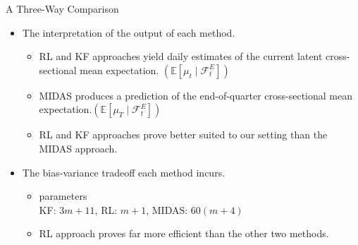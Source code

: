 \documentclass[UTF8, 16pt]{beamer}
\begin{document}
\begin{CJK*}{UTF8}{gbsn}
\begin{frame}{A Three-Way Comparison}
	\begin{itemize}
		\item The interpretation of the output of each method.
			\begin{itemize}
				\item RL and KF approaches yield daily estimates of the current latent cross-sectional mean expectation. $(\mathbb{E}\left[\mu_{t} \mid \mathcal{F}_{t}^{E}\right])$
				\item MIDAS produces a prediction of the end-of-quarter cross-sectional mean expectation.$(\mathbb{E}\left[\mu_{T} \mid \mathcal{F}_{t}^{E}\right])$
				\item RL and KF approaches prove better suited to our setting than the MIDAS approach.
			\end{itemize}
		\item The bias-variance tradeoff each method incurs.
			\begin{itemize}
				\item parameters\\
					KF: $3m+11$, RL: $m+1$, MIDAS: $60(m+4)$
				\item RL approach proves far more efficient than the other two methods.
			\end{itemize}
	\end{itemize}
\end{frame}

\end{CJK*}
\end{document}
